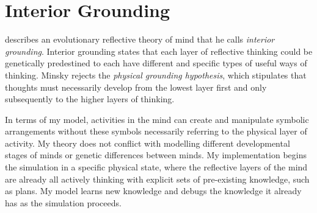 \section{Interior Grounding}

\cite{minsky:2005} describes an evolutionary reflective theory of mind
that he calls \emph{interior grounding}.  Interior grounding states
that each layer of reflective thinking could be genetically
predestined to each have different and specific types of useful ways
of thinking.  Minsky rejects the \emph{physical grounding hypothesis},
which stipulates that thoughts must necessarily develop from the
lowest layer first and only subsequently to the higher layers of
thinking.

In terms of my model, activities in the mind can create and manipulate
symbolic arrangements without these symbols necessarily referring to
the physical layer of activity.  My theory does not conflict with
modelling different developmental stages of minds or genetic
differences between minds.  My implementation begins the simulation in
a specific physical state, where the reflective layers of the mind are
already all actively thinking with explicit sets of pre-existing
knowledge, such as plans.  My model learns new knowledge and debugs
the knowledge it already has as the simulation proceeds.


